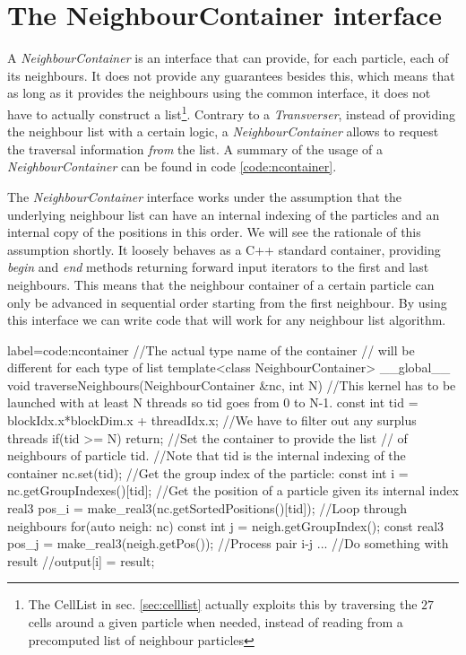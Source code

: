 \documentclass[ twoside,openright,titlepage,numbers=noenddot,%
headinclude,footinclude,cleardoublepage=empty,abstract=on,
BCOR=5mm,paper=b5,fontsize=11pt, dvipsnames
]{scrreprt}
\begin{document}
\section{The NeighbourContainer interface}\label{sec:ncontainer}
A \emph{NeighbourContainer} is an interface that can provide, for each particle, each of its neighbours. It does not provide any guarantees besides this, which means that as long as it provides the neighbours using the common interface, it does not have to actually construct a list\footnote{The CellList in sec. \ref{sec:celllist} actually exploits this by traversing the $27$ cells around a given particle when needed, instead of reading from a precomputed list of neighbour particles}. Contrary to a \emph{Transverser}, instead of providing the neighbour list with a certain logic, a \emph{NeighbourContainer} allows to request the traversal information \emph{from} the list. A summary of the usage of a \emph{NeighbourContainer} can be found in code \ref{code:ncontainer}.

The \emph{NeighbourContainer} interface works under the assumption that the underlying neighbour list can have an internal indexing of the particles and an internal copy of the positions in this order. We will see the rationale of this assumption shortly.
It loosely behaves as a C++ standard container, providing \emph{begin} and \emph{end} methods returning forward input iterators to the first and last neighbours. This means that the neighbour container of a certain particle can only be advanced in sequential order starting from the first neighbour.
By using this interface we can write code that will work for any neighbour list algorithm.

\begin{code2}
{label=code:ncontainer}
//The actual type name of the container
//  will be different for each type of list
template<class NeighbourContainer>
__global__ void traverseNeighbours(NeighbourContainer &nc, int N){
  //This kernel has to be launched with at least N threads so tid goes from 0 to N-1.
  const int tid = blockIdx.x*blockDim.x + threadIdx.x;
  //We have to filter out any surplus threads
  if(tid >= N) return;                                   
  //Set the container to provide the list 
  // of neighbours of particle tid.
  //Note that tid is the internal indexing of the container
  nc.set(tid);
  //Get the group index of the particle:
  const int i = nc.getGroupIndexes()[tid];
  //Get the position of a particle given its internal index
  real3 pos_i = make_real3(nc.getSortedPositions()[tid]);
  //Loop through neighbours
  for(auto neigh: nc){
    const int j = neigh.getGroupIndex();
    const real3 pos_j = make_real3(neigh.getPos());
    //Process pair i-j
    ...
  }
  //Do something with result
  //output[i] = result;
  }
\end{code2}
\end{document}
